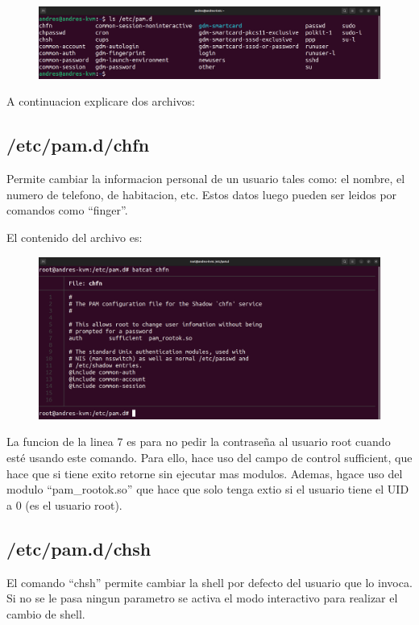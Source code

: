 \documentclass{article}
\begin{document}
\begin{figure}[H]
    \includegraphics[width=\textwidth]{imagenes/lspam.png}
\end{figure}

A continuacion explicare dos archivos:

\subsection{/etc/pam.d/chfn}
Permite cambiar la informacion personal de un usuario tales como: el nombre, el numero de telefono, de habitacion, etc. Estos datos luego pueden ser leidos por comandos como ``finger''.

El contenido del archivo es:

\begin{figure}[H]
    \includegraphics[width=\textwidth]{imagenes/pamchfn.png}
\end{figure}

La funcion de la linea 7 es para no pedir la contraseña al usuario root cuando esté usando este comando. Para ello, hace uso del campo de control sufficient, que hace que si tiene exito retorne sin ejecutar mas modulos. Ademas, hgace uso del modulo ``pam\_rootok.so'' que hace que solo tenga extio si el usuario tiene el UID a 0 (es el usuario root).

\subsection{/etc/pam.d/chsh}
El comando ``chsh'' permite cambiar la shell por defecto del usuario que lo invoca. Si no se le pasa ningun parametro se activa el modo interactivo para realizar el cambio de shell.
\end{document}
